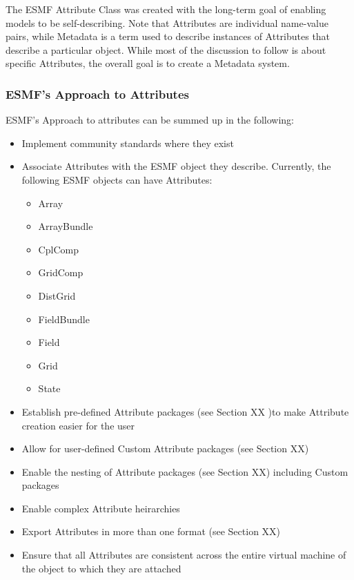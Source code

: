 %


The ESMF Attribute Class was created with the long-term goal of enabling models to be self-describing. Note that Attributes are individual name-value pairs, while Metadata is a term used to describe instances of Attributes that describe a particular object. While most of the discussion to follow is about specific Attributes, the overall goal is to create a Metadata system.   

\subsubsection{ESMF's Approach to Attributes}

ESMF's Approach to attributes can be summed up in the following:

\begin{itemize}
  \item Implement community standards where they exist
  \item Associate Attributes with the ESMF object they describe. Currently, the following ESMF objects can have Attributes:
  \begin{itemize}
     \item Array
     \item ArrayBundle
     \item CplComp
     \item GridComp
     \item DistGrid
     \item FieldBundle
     \item Field
     \item Grid
     \item State
     \end{itemize}
  \item Establish pre-defined Attribute packages (see Section XX )to make Attribute creation easier for the user
  \item Allow for user-defined Custom Attribute packages (see Section XX)
  \item Enable the nesting of Attribute packages (see Section XX) including Custom packages
  \item Enable complex Attribute heirarchies
  \item Export Attributes in more than one format (see Section XX)
  \item Ensure that all Attributes are consistent across the entire virtual machine of the object to which they are attached  
\end{itemize}

